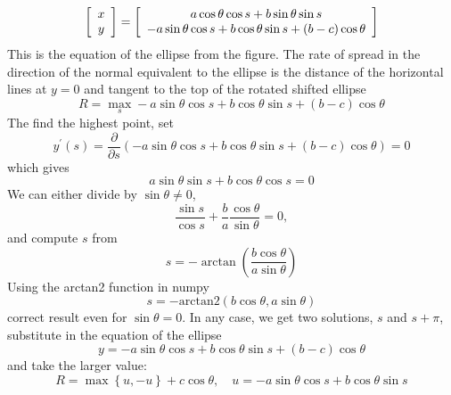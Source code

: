 \documentclass{article}%
\begin{document}
\[
\left[
\begin{array}
[c]{c}%
x\\
y
\end{array}
\right]  =\left[
\begin{array}
[c]{c}%
a\cos\theta\cos s+b\sin\theta\sin s\\
-a\sin\theta\cos s+b\cos\theta\sin s+(b-c)\cos\theta
\end{array}
\right]
\]
This is the equation of the ellipse from the figure. The rate of spread in the
direction of the normal equivalent to the ellipse is the distance of the
horizontal lines at $y=0$ and tangent to the top of the rotated shifted
ellipse%
\[
R=\max_{s}-a\sin\theta\cos s+b\cos\theta\sin s+(b-c)\cos\theta
\]
The find the highest point, set%
\[
y^{\prime}\left(  s\right)  =\frac{\partial}{\partial s}\left(  -a\sin
\theta\cos s+b\cos\theta\sin s+(b-c)\cos\theta\right)  =0
\]
which gives%
\[
a\sin\theta\sin s+b\cos\theta\cos s=0
\]
We can either divide by $\sin\theta\neq0$,
\[
\frac{\sin s}{\cos s}+\frac{b}{a}\frac{\cos\theta}{\sin\theta}=0,
\]
and compute $s$ from%
\[
s=-\arctan\left(  \frac{b\cos\theta}{a\sin\theta}\right)
\]
Using the arctan2 function in numpy%
\[
s=-\text{arctan2}\left(  b\cos\theta,a\sin\theta\right)
\]
correct result even for $\sin\theta=0.$ In any case, we get two solutions, $s$
and $s+\pi$,  substitute in the equation of the ellipse%
\[
y=-a\sin\theta\cos s+b\cos\theta\sin s+\left(  b-c\right)  \cos\theta
\]
and take the larger value:%
\[
R=\max\left\{  u,-u\right\}  +c\cos\theta,\quad u=-a\sin\theta\cos
s+b\cos\theta\sin s
\]
\end{document}
